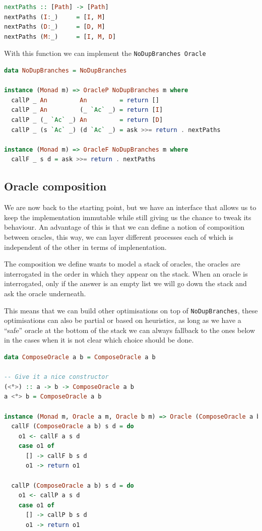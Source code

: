 \documentclass[11pt]{article}
\begin{document}
\begin{lstlisting}[language=haskell]
nextPaths :: [Path] -> [Path]
nextPaths (I:_)     = [I, M]
nextPaths (D:_)     = [D, M]
nextPaths (M:_)     = [I, M, D]
\end{lstlisting}

With this function we can implement the \texttt{NoDupBranches Oracle}

\begin{lstlisting}[language=haskell]
data NoDupBranches = NoDupBranches

instance (Monad m) => OracleP NoDupBranches m where
  callP _ An         An         = return []
  callP _ An         (_ `Ac` _) = return [I]
  callP _ (_ `Ac` _) An         = return [D]
  callP _ (s `Ac` _) (d `Ac` _) = ask >>= return . nextPaths

instance (Monad m) => OracleF NoDupBranches m where
  callF _ s d = ask >>= return . nextPaths
\end{lstlisting}

\subsection{Oracle composition}

We are now back to the starting point, but we have an interface that allows us 
to keep the implementation immutable while still giving us the chance to tweak 
its behaviour. An advantage of this is that we can define a notion of 
composition between oracles, this way, we can layer different processes each of 
which is independent of the other in terms of implenentation.

The composition we define wants to model a stack of oracles, the oracles are 
interrogated in the order in which they appear on the stack. When an oracle is 
interrogated, only if the answer is an empty list we will go down the stack and 
ask the oracle underneath. 

This means that we can build other optimisations on top of 
\texttt{NoDupBranches}, these optimisations can also be partial or based on 
heuristics, as long as we have a ``safe'' oracle at the bottom of the stack we 
can always fallback to the ones below in the cases when it is not clear which 
choice should be done.


\begin{lstlisting}[language=haskell]
  data ComposeOracle a b = ComposeOracle a b

-- Give it a nice constructor
(<°>) :: a -> b -> ComposeOracle a b
a <°> b = ComposeOracle a b

instance (Monad m, Oracle a m, Oracle b m) => Oracle (ComposeOracle a b) m where
  callF (ComposeOracle a b) s d = do
    o1 <- callF a s d
    case o1 of
      [] -> callF b s d
      o1 -> return o1

  callP (ComposeOracle a b) s d = do
    o1 <- callP a s d
    case o1 of
      [] -> callP b s d
      o1 -> return o1
\end{lstlisting}
\end{document}
